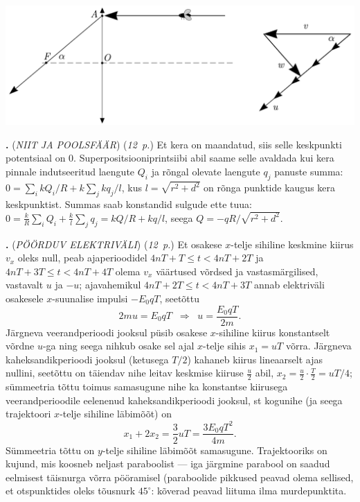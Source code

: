 \documentclass[12pt,a5paper]{article}
\newcommand{\numb}[1]{\vspace{5pt}\textbf{\large #1}}
\newcommand{\nimi}[1]{(\textsl{\small #1})}
\newcommand{\punktid}[1]{(\emph{#1~p.})}
\newcounter{ylesanne}
\newcommand{\yl}[1]{\addtocounter{ylesanne}{1}\numb{\theylesanne.} \nimi{#1} \newblock{}}
\begin{document}
\begin{center}
\includegraphics[scale=0.7]{kxrbes.pdf}
\end{center}

\yl{NIIT JA POOLSFÄÄR} \punktid{12} Et kera on maandatud, siis selle keskpunkti potentsiaal on 0. Superpositsiooniprintsiibi abil saame selle avaldada kui kera pinnale indutseeritud laengute $Q_i$ ja rõngal olevate laengute $q_j$ panuste summa: $0=\sum_i kQ_i/R+k\sum_jkq_j/l$, kus $l=\sqrt{r^2+d^2}$ on rõnga punktide kaugus kera keskpunktist. Summas saab konstandid sulgude ette tuua: $0=\frac kR \sum_iQ_i+\frac kl\sum_jq_j=kQ/R+kq/l$, seega $Q=-qR/\sqrt{r^2+d^2}$.

\yl{PÖÖRDUV ELEKTRIVÄLI} \punktid{12} Et osakese $x$-telje sihiline keskmine kiirus $v_x$ oleks null, peab ajaperioodidel $4nT+T\le t < 4nT+2T$ ja  $4nT+3T\le t < 4nT+4T$ olema $v_x$ väärtused võrdsed ja vastasmärgilised, vastavalt $u$ ja $-u$; ajavahemikul $4nT+2T\le t < 4nT+3T$ annab elektriväli osakesele $x$-suunalise impulsi $-E_0qT$, seetõttu
$$2mu=E_0qT \;\;\Rightarrow\;\; u=\frac{E_0qT}{2m}.$$
Järgneva veerandperioodi jooksul püsib osakese $x$-sihiline kiirus konstantselt võrdne $u$-ga ning seega nihkub osake sel ajal $x$-telje sihis $x_1=uT$ võrra. Järgneva kaheksandikperioodi jooksul (ketusega $T/2$) kahaneb kiirus lineaarselt ajas nullini, seetõttu on täiendav nihe leitav keskmise kiiruse $\frac u2$ abil, $x_2=\frac u2\cdot \frac T2=uT/4$; sümmeetria tõttu toimus samasugune nihe ka konstantse kiirusega veerandperioodile eelenenud kaheksandikperioodi jooksul, st kogunihe (ja seega trajektoori $x$-telje sihiline läbimõõt) on $$x_1+2x_2=\frac32 uT=\frac{3E_0qT^2}{4m}.$$
Sümmeetria tõttu on $y$-telje sihiline läbimõõt samasugune. Trajektooriks on kujund, mis koosneb neljast paraboolist --- iga järgmine parabool on saadud eelmisest täisnurga võrra pööramisel (paraboolide pikkused peavad olema sellised, et otspunktides oleks tõusnurk $45^\circ$: kõverad peavad liituma ilma murdepunktita.
\end{document}
